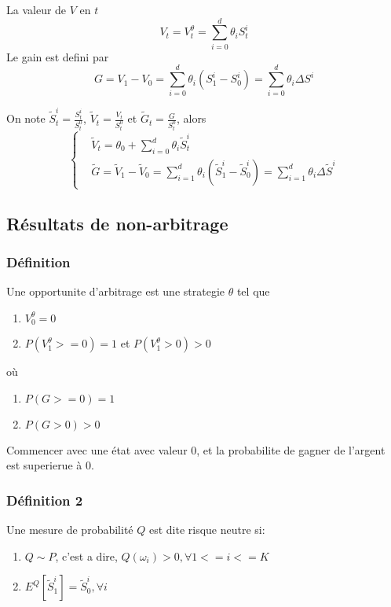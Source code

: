\documentclass{article}
\begin{document}
La valeur de $V$ en $t$
\begin{equation}
V_t=V_t^\theta=\sum_{i=0}^d\theta_i S_t^i
\end{equation}
Le gain est defini par 
\begin{equation}
G=V_1-V_0=\sum_{i=0}^d \theta_i (S_1^i-S_0^i)=\sum_{i=0}^d \theta_i \Delta S^i
\end{equation}

On note $\tilde{S}_t^i=\frac{S_t^i}{S_t^0}$, $\tilde{V}_t=\frac{V_t}{S_t^0}$ et $\tilde{G}_t=\frac{G}{S_t^0}$,
alors
\begin{equation}
\left \{ \begin{array}{rcl}
&\tilde{V}_t =\theta_0+\sum_{i=0}^{d}\theta_i \tilde{S}_t^i\\
&\tilde{G} =\tilde{V}_1-\tilde{V}_0=\sum_{i=1}^d \theta_i (\tilde{S}_1^i-\tilde{S}_0^i)=\sum_{i=1}^d\theta_i\Delta \tilde{S}^i
\end{array}\right.
\end{equation}

\subsection{R\'esultats de non-arbitrage}
\subsubsection{D\'efinition}

Une opportunite d'arbitrage est une strategie $\theta$ tel que 
\begin{enumerate}
	\item  $V_0^\theta =0$
	\item $P(V_1^\theta >=0) = 1$ et $P(V_1^\theta>0)>0$ 
\end{enumerate}
o\`u
\begin{enumerate}
	\item $P(G>=0) = 1$
	\item $P(G>0) > 0$
\end{enumerate}

Commencer avec une \'etat avec valeur $0$, et la probabilite de gagner de l'argent est superierue \`a $0$.

\subsubsection{D\'efinition 2}

Une mesure de probabilit\'e $Q$ est dite risque neutre si:
\begin{enumerate}
	\item $Q\sim P$, c'est a dire, $Q(\omega_i)>0, \forall 1<=i<=K$
	\item $E^Q[\tilde{S}_1^i]=\tilde{S}_0^i, \forall i$
\end{enumerate}
\end{document}
